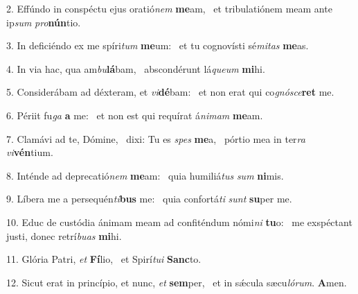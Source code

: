 2. Effúndo in conspéctu ejus oratió\textit{nem} \textbf{me}am, \ast\  et tribulatiónem meam ante ip\textit{sum} \textit{pro}\textbf{nún}tio.\

3. In deficiéndo ex me spíri\textit{tum} \textbf{me}um: \ast\  et tu cognovísti sé\textit{mi}\textit{tas} \textbf{me}as.\

4. In via hac, qua am\textit{bu}\textbf{lá}bam, \ast\  abscondérunt lá\textit{que}\textit{um} \textbf{mi}hi.\

5. Considerábam ad déxteram, et \textit{vi}\textbf{dé}bam: \ast\  et non erat qui co\textit{gnó}\textit{sce}\textbf{ret} me.\

6. Périit fu\textit{ga} \textbf{a} me: \ast\  et non est qui requírat á\textit{ni}\textit{mam} \textbf{me}am.\

7. Clamávi ad te, Dómine, \dag\  dixi: Tu es \textit{spes} \textbf{me}a, \ast\  pórtio mea in ter\textit{ra} \textit{vi}\textbf{vén}tium.\

8. Inténde ad deprecatió\textit{nem} \textbf{me}am: \ast\  quia humiliá\textit{tus} \textit{sum} \textbf{ni}mis.\

9. Líbera me a persequén\textit{ti}\textbf{bus} me: \ast\  quia confortá\textit{ti} \textit{sunt} \textbf{su}per me.\

10. Educ de custódia ánimam meam ad confiténdum nómi\textit{ni} \textbf{tu}o: \ast\  me exspéctant justi, donec retrí\textit{bu}\textit{as} \textbf{mi}hi.\

11. Glória Patri, \textit{et} \textbf{Fí}lio, \ast\  et Spirí\textit{tu}\textit{i} \textbf{Sanc}to.\

12. Sicut erat in princípio, et nunc, \textit{et} \textbf{sem}per, \ast\  et in sǽcula sæcu\textit{ló}\textit{rum}. \textbf{A}men.\


